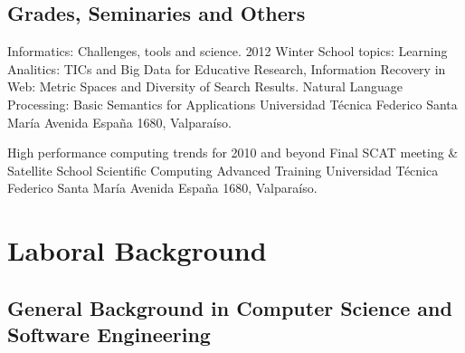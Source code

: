 \documentclass[11pt,letterpaper,roman]{moderncv}
\begin{document}
\subsection{Grades, Seminaries and Others}

	{Informatics: Challenges, tools and science.}
	{2012 Winter School}
	{topics: Learning Analitics: TICs and Big Data for Educative Research, Information Recovery in Web: Metric Spaces and Diversity of Search Results. Natural Language Processing: Basic Semantics for Applications }
	{Universidad T\'ecnica Federico Santa Mar\'ia}
	{Avenida España 1680, Valpara\'iso.}
	
	
	{High performance computing trends for 2010 and beyond}
	{Final SCAT meeting \& Satellite School}
	{Scientific Computing Advanced Training}
	{Universidad T\'ecnica Federico Santa Mar\'ia}
	{Avenida España 1680, Valpara\'iso.}


\section{Laboral Background}

% 
% 
% 
% 
%
\subsection{General Background in Computer Science and Software Engineering}
\end{document}
